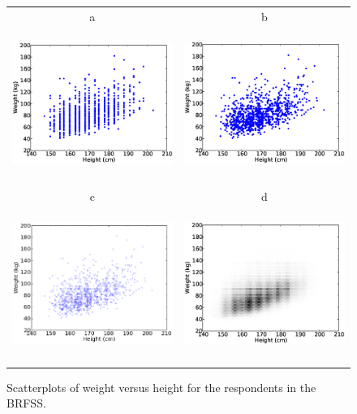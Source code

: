 \documentclass[12pt]{book}
\begin{document}
\begin{figure}
\centering
\begin{tabular}{cc}
a\includegraphics[height=2.0in]{figs/scatter1.eps} &
b\includegraphics[height=2.0in]{figs/scatter2.eps} \\
c\includegraphics[height=2.0in]{figs/scatter3.eps} &
d\includegraphics[height=2.0in]{figs/scatter4.eps} \\ 
\end{tabular}
\caption{Scatterplots of weight versus height for the respondents
in the BRFSS.}
\label{scatterplots}
\end{figure}
\end{document}
